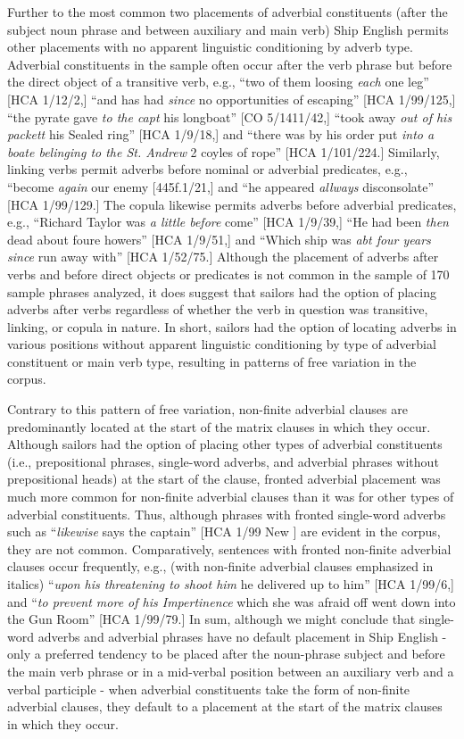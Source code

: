   Further to the most common two placements of adverbial constituents (after the subject noun phrase and between auxiliary and main verb) Ship English permits other placements with no apparent linguistic conditioning by adverb type. Adverbial constituents in the sample often occur after the verb phrase but before the direct object of a transitive verb, e.g., “two of them loosing \textit{each} one leg” [HCA 1/12/2,] “and has had \textit{since} no opportunities of escaping” [HCA 1/99/125,] “the pyrate gave \textit{to the capt} his longboat” [CO 5/1411/42,] “took away \textit{out of his packett} his Sealed ring” [HCA 1/9/18,] and “there was by his order put \textit{into a boate belinging to the St. Andrew} 2 coyles of rope” [HCA 1/101/224.] Similarly, linking verbs permit adverbs before nominal or adverbial predicates, e.g., “become \textit{again} our enemy [445f.1/21,] and “he appeared \textit{allways} disconsolate” [HCA 1/99/129.] The copula likewise permits adverbs before adverbial predicates, e.g., “Richard Taylor was \textit{a little before} come” [HCA 1/9/39,] “He had been \textit{then} dead about foure howers” [HCA 1/9/51,] and “Which ship was \textit{abt four years since} run away with” [HCA 1/52/75.] Although the placement of adverbs after verbs and before direct objects or predicates is not common in the sample of 170 sample phrases analyzed, it does suggest that sailors had the option of placing adverbs after verbs regardless of whether the verb in question was transitive, linking, or copula in nature. In short, sailors had the option of locating adverbs in various positions without apparent linguistic conditioning by type of adverbial constituent or main verb type, resulting in patterns of free variation in the corpus. 

Contrary to this pattern of free variation, non-finite adverbial clauses are predominantly located at the start of the matrix clauses in which they occur. Although sailors had the option of placing other types of adverbial constituents (i.e., prepositional phrases, single-word adverbs, and adverbial phrases without prepositional heads) at the start of the clause, fronted adverbial placement was much more common for non-finite adverbial clauses than it was for other types of adverbial constituents. Thus, although phrases with fronted single-word adverbs such as “\textit{likewise} says the captain” [HCA 1/99 New \citealt{Providence1722}] are evident in the corpus, they are not common. Comparatively, sentences with fronted non-finite adverbial clauses occur frequently, e.g., (with non-finite adverbial clauses emphasized in italics) “\textit{upon his threatening to shoot him} he delivered up to him” [HCA 1/99/6,] and “\textit{to prevent more of his Impertinence} which she was afraid off went down into the Gun Room” [HCA 1/99/79.] In sum, although we might conclude that single-word adverbs and adverbial phrases have no default placement in Ship English - only a preferred tendency to be placed after the noun-phrase subject and before the main verb phrase or in a mid-verbal position between an auxiliary verb and a verbal participle - when adverbial constituents take the form of non-finite adverbial clauses, they default to a placement at the start of the matrix clauses in which they occur. 

